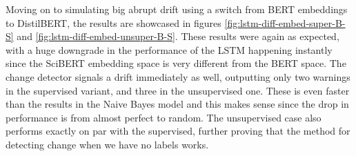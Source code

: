 \documentclass[12pt]{extreport}
\begin{document}
Moving on to simulating big abrupt drift using a switch from BERT embeddings to DistilBERT, the results are showcased in figures \ref{fig:lstm-diff-embed-super-B-S} and \ref{fig:lstm-diff-embed-unsuper-B-S}. These results were again as expected, with a huge downgrade in the performance of the LSTM happening instantly since the SciBERT embedding space is very different from the BERT space. The change detector signals a drift immediately as well, outputting only two warnings in the supervised variant, and three in the unsupervised one. These is even faster than the results in the Naive Bayes model and this makes sense since the drop in performance is from almost perfect to random. The unsupervised case also performs exactly on par with the supervised, further proving that the method for detecting change when we have no labels works.
\end{document}
